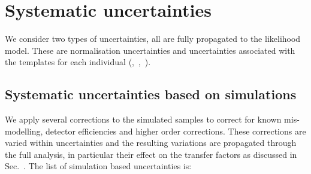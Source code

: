 \section{Systematic uncertainties}
\label{sec:systematics}

We consider two types of uncertainties, all are fully propagated to the likelihood model.
These are normalisation uncertainties and uncertainties associated with the \mht templates for each individual (\njet,~\nb,~\scalht).



\subsection{Systematic uncertainties based on simulations}


We apply several corrections to the simulated samples to correct for known mis-modelling, detector efficiencies and higher order corrections.
These corrections are varied within uncertainties and the resulting variations are propagated through the full analysis, in particular their effect
on the transfer factors as discussed in Sec.~. The list of simulation based uncertainties is:

